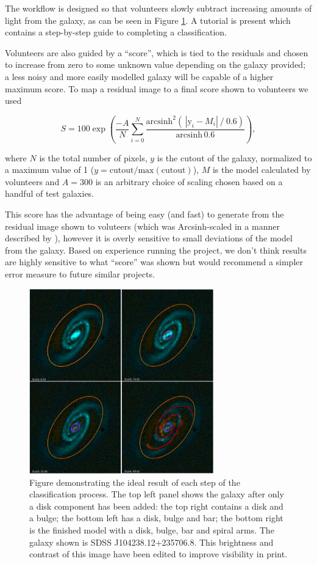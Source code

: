 \documentclass[../main.tex]{subfiles}
\begin{document}
The workflow is designed so that volunteers slowly subtract increasing amounts of light from the galaxy, as can be seen in Figure \ref{fig:residualsStepByStep}. A tutorial is present which contains a step-by-step guide to completing a classification.

Volunteers are also guided by a ``score'', which is tied to the residuals and chosen to increase from zero to some unknown value depending on the galaxy provided; a less noisy and more easily modelled galaxy will be capable of a higher maximum score. To map a residual image to a final score shown to volunteers we used

\begin{equation*}
    S = 100 \exp\left(\frac{-A}{N}\sum_{i=0}^N\frac{\text{arcsinh}^2\left(\,|\text{y}_i - M_i|\ /\ 0.6\right)}{\text{arcsinh}\,0.6 }\right),
\end{equation*}

where $N$ is the total number of pixels, $y$ is the cutout of the galaxy, normalized to a maximum value of 1 ($y = \text{cutout}/\text{max}(\text{cutout})$), $M$ is the model calculated by volunteers and $A=300$ is an arbitrary choice of scaling chosen based on a handful of test galaxies.

This score has the advantage of being easy (and fast) to generate from the residual image shown to voluteers (which was Arcsinh-scaled in a manner described by \citealt{Lupton2003:astro-ph/0312483v1}), however it is overly sensitive to small deviations of the model from the galaxy. Based on experience running the project, we don't think results are highly sensitive to what ``score'' was shown but would recommend a simpler error measure to future similar projects.

\begin{figure}
  \includegraphics[width=8cm]{images/residualProgress.jpg}
  \caption{Figure demonstrating the ideal result of each step of the classification process. The top left panel shows the galaxy after only a disk component has been added: the top right contains a disk and a bulge; the bottom left has a disk, bulge and bar; the bottom right is the finished model with a disk, bulge, bar and spiral arms. The galaxy shown is SDSS J104238.12+235706.8. This brightness and contrast of this image have been edited to improve visibility in print.}
  \label{fig:residualsStepByStep}
\end{figure}
\end{document}
